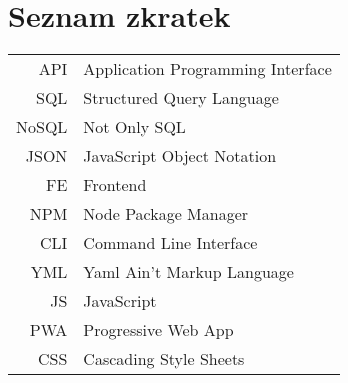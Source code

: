 
\chapter{Seznam zkratek}

\begin{tabular}{rl}
    API & Application Programming Interface \\
    SQL & Structured Query Language \\
    NoSQL & Not Only SQL \\
    JSON & JavaScript Object Notation \\
    FE & Frontend \\
    NPM & Node Package Manager \\
    CLI & Command Line Interface \\
    YML & Yaml Ain't Markup Language \\
    JS & JavaScript \\
    PWA & Progressive Web App \\
    CSS & Cascading Style Sheets \\
\end{tabular}
